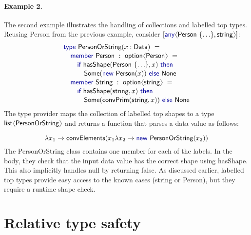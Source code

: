 \documentclass[10pt,nocopyrightspace]{sigplanconf}
\newcommand{\langl}{\begin{picture}(4.5,7)
\put(1.1,2.5){\rotatebox{60}{\line(1,0){5.5}}}
\put(1.1,2.5){\rotatebox{300}{\line(1,0){5.5}}}
\end{picture}}
\newcommand{\rangl}{\begin{picture}(4.5,7)
\put(.9,2.5){\rotatebox{120}{\line(1,0){5.5}}}
\put(.9,2.5){\rotatebox{240}{\line(1,0){5.5}}}
\end{picture}}
\newcommand{\kvd}[1]{\textnormal{\textcolor{kvdclr}{\sffamily #1}}}
\newcommand{\ident}[1]{\textnormal{\sffamily #1}}
\begin{document}
\paragraph{Example 2.} The second example illustrates the handling of collections and
labelled top types. Reusing \ident{Person} from the previous example, consider
$[\kvd{any}\langl\ident{Person}~\{ \ldots \},\ident{string}\rangl]$:
\begin{equation*}
\begin{array}{l}
 \kvd{type}~\ident{PersonOrString}(x:\ident{Data})~= \\[0.1em]
 \quad \kvd{member}~\ident{Person}~:~\ident{option}\langl\ident{Person}\rangl~= \\[0.1em]
 \qquad \kvd{if}~\ident{hasShape}(\ident{Person}~\{ \ldots \}, x)~\kvd{then}\\[0.1em]
 \qquad\quad \ident{Some}(\kvd{new}~\ident{Person}(x))~\kvd{else}~\ident{None} \\[0.1em]
 \quad \kvd{member}~\ident{String}~:~\ident{option}\langl\ident{string}\rangl~= \\[0.1em]
 \qquad \kvd{if}~\ident{hasShape}(\ident{string}, x)~\kvd{then}\\[0.1em]
 \qquad\quad \ident{Some}(\ident{convPrim}(\ident{string}, x))~\kvd{else}~\ident{None}
\end{array}
\end{equation*}
The type provider maps the collection of labelled top shapes to a type $\ident{list}\langl\ident{PersonOrString}\rangl$
and returns a function that parses a data value as follows:

\noindent
\begin{equation*}
\lambda x_1\rightarrow \ident{convElements}(x_1\lambda x_2\rightarrow\kvd{new}~\ident{PersonOrString}(x_2))
\end{equation*}
The \ident{PersonOrString} class contains one member for each of the labels. In the body, they
check that the input data value has the correct shape using \ident{hasShape}. This also implicitly
handles \kvd{null} by returning \kvd{false}. As discussed earlier, labelled top types provide easy
access to the known cases (\ident{string} or \ident{Person}), but they require a runtime shape check.



\section{Relative type safety}
\label{sec:safety}
\end{document}
